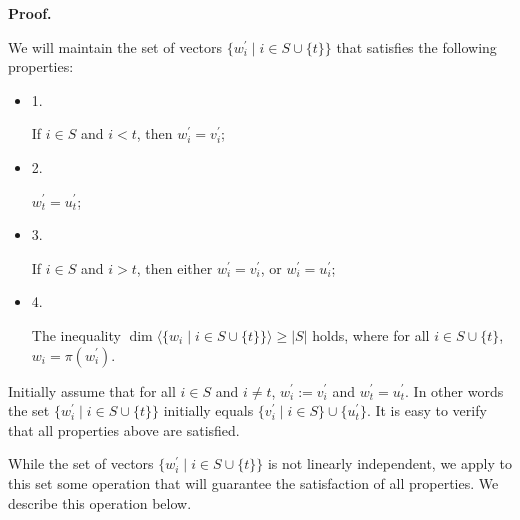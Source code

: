 \documentclass[10pt,a4paper]{article}
\begin{document}
\par\medskip\noindent\textbf{
Proof.}\par


We will maintain the set of vectors $\{w^{\prime}_{i}\mid i\in S\cup\{t\}\}$ that satisfies the following properties:\par


\begin{itemize}


\item 
1. 


If $i\in S$ and $i<t$, then $w^{\prime}_{i}=v_{i}^{\prime}$;\par





\item 
2. 


$w^{\prime}_{t}=u^{\prime}_{t}$;\par





\item 
3. 


If $i\in S$ and $i>t$, then either $w^{\prime}_{i}=v_{i}^{\prime}$, or $w^{\prime}_{i}=u_{i}^{\prime}$;\par





\item 
4. 


The inequality $\dim\langle\{w_{i}\mid i\in S\cup\{t\}\}\rangle\geq|S|$ holds, where for all $i\in S\cup\{t\}$, $w_{i}=\pi(w^{\prime}_{i})$.\par





\end{itemize}



Initially assume that for all $i\in S$ and $i\neq t$, $w^{\prime}_{i}:=v_{i}^{\prime}$ and $w^{\prime}_{t}=u^{\prime}_{t}$. In other words the set $\{w_{i}^{\prime}\mid i\in S\cup\{t\}\}$ initially equals $\{v_{i}^{\prime}\mid i\in S\}\cup\{u^{\prime}_{t}\}$. It is easy to verify that all properties above are satisfied.\par



While the set of vectors $\{w_{i}^{\prime}\mid i\in S\cup\{t\}\}$ is not linearly independent, we apply to this set some operation that will guarantee the satisfaction of all properties. We describe this operation below.\par
\end{document}
